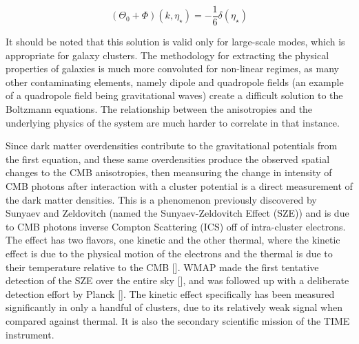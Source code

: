 \documentclass[manuscript]{aastex}
\begin{document}
\begin{equation}\label{eq:boltz2}
(\Theta_{0} + \Phi)(k,\eta_{\star}) = -\frac{1}{6} \delta(\eta_{\star})
\end{equation}

It should be noted that this solution is valid only for large-scale modes, which is appropriate for galaxy clusters. The methodology for extracting the physical properties of galaxies is much more convoluted for non-linear regimes, as many other contaminating elements, namely dipole and quadropole fields (an example of a quadropole field being gravitational waves) create a difficult solution to the Boltzmann equations. The relationship between the anisotropies and the underlying physics of the system are much harder to correlate in that instance. 

Since dark matter overdensities contribute to the gravitational potentials from the first equation, and these same overdensities produce the observed spatial changes to the CMB anisotropies, then meansuring the change in intensity of CMB photons after interaction with a cluster potential is a direct measurement of the dark matter densities. This is a phenomenon previously discovered by Sunyaev and Zeldovitch (named the Sunyaev-Zeldovitch Effect (SZE)) and is due to CMB photons inverse Compton Scattering (ICS) off of intra-cluster electrons. The effect has two flavors, one kinetic and the other thermal, where the kinetic effect is due to the physical motion of the electrons and the thermal is due to their temperature relative to the CMB [\cite{Sunyaev1970}]. WMAP made the first tentative detection of the SZE over the entire sky [\cite{Bond2003}], and was followed up with a deliberate detection effort by Planck [\cite{Planck2013}]. The kinetic effect specifically has been measured significantly in only a handful of clusters, due to its relatively weak signal when compared against thermal. It is also the secondary scientific mission of the TIME instrument. 
\end{document}

